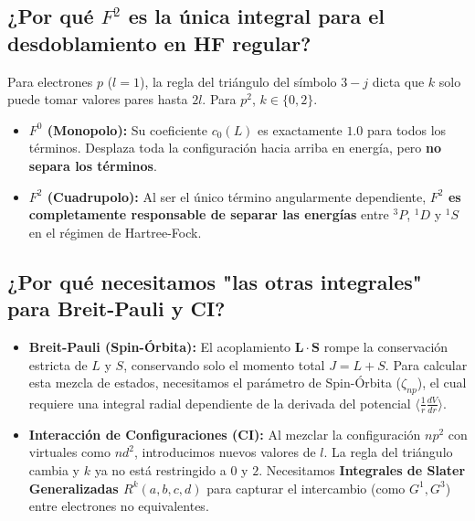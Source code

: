 \documentclass[11pt,a4paper]{article}
\begin{document}
\subsection{¿Por qué $F^2$ es la única integral para el desdoblamiento en HF regular?}
Para electrones $p$ ($l=1$), la regla del triángulo del símbolo $3-j$ dicta que $k$ solo puede tomar valores pares hasta $2l$. Para $p^2$, $k \in \{0, 2\}$.
\begin{itemize}
    \item \textbf{$F^0$ (Monopolo):} Su coeficiente $c_0(L)$ es exactamente $1.0$ para todos los términos. Desplaza toda la configuración hacia arriba en energía, pero \textbf{no separa los términos}.
    \item \textbf{$F^2$ (Cuadrupolo):} Al ser el único término angularmente dependiente, \textbf{$F^2$ es completamente responsable de separar las energías} entre $^3P$, $^1D$ y $^1S$ en el régimen de Hartree-Fock.
\end{itemize}

\subsection{¿Por qué necesitamos "las otras integrales" para Breit-Pauli y CI?}
\begin{itemize}
    \item \textbf{Breit-Pauli (Spin-Órbita):} El acoplamiento $\mathbf{L} \cdot \mathbf{S}$ rompe la conservación estricta de $L$ y $S$, conservando solo el momento total $J = L + S$. Para calcular esta mezcla de estados, necesitamos el parámetro de Spin-Órbita ($\zeta_{np}$), el cual requiere una integral radial dependiente de la derivada del potencial $\langle \frac{1}{r} \frac{dV}{dr} \rangle$.
    \item \textbf{Interacción de Configuraciones (CI):} Al mezclar la configuración $np^2$ con virtuales como $nd^2$, introducimos nuevos valores de $l$. La regla del triángulo cambia y $k$ ya no está restringido a $0$ y $2$. Necesitamos \textbf{Integrales de Slater Generalizadas $R^k(a,b,c,d)$} para capturar el intercambio (como $G^1, G^3$) entre electrones no equivalentes.
\end{itemize}
\end{document}
